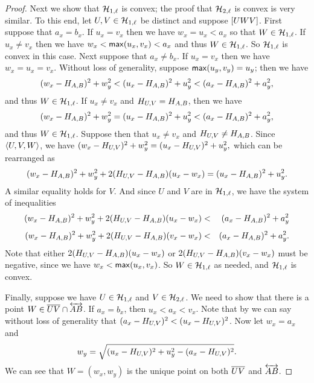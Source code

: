 \begin{proof}
Next we show that \(\mathcal{H}_{1,\ell}\) is convex; the proof that \(\mathcal{H}_{2,\ell}\) is convex is very similar. To this end, let \(U,V \in \mathcal{H}_{1,\ell}\) be distinct and suppose \([ U W V ]\).
First suppose that \(a_x = b_x\).
If \(u_x = v_x\) then we have \(w_x = u_x < a_x\) so that \(W \in \mathcal{H}_{1,\ell}\).
If \(u_x \neq v_x\) then we have \(w_x < \mathsf{max}(u_x,v_x) < a_x\) and thus \(W \in \mathcal{H}_{1,\ell}\).
So \(\mathcal{H}_{1,\ell}\) is convex in this case.
Next suppose that \(a_x \neq b_x\).
If \(u_x = v_x\) then we have \(w_x = u_x = v_x\).
Without loss of generality, suppose \(\mathsf{max}(u_y,v_y) = u_y\); then we have \[ (w_x - H_{A,B})^2 + w_y^2 < (u_x - H_{A,B})^2 + u_y^2 < (a_x - H_{A,B})^2 + a_y^2, \] and thus \(W \in \mathcal{H}_{1,\ell}\).
If \(u_x \neq v_x\) and \(H_{U,V} = H_{A,B}\), then we have \[ (w_x - H_{A,B})^2 + w_y^2 = (u_x - H_{A,B})^2 + u_y^2 < (a_x - H_{A,B})^2 + a_y^2, \] and thus \(W \in \mathcal{H}_{1,\ell}\).
Suppose then that \(u_x \neq v_x\) and \(H_{U,V} \neq H_{A,B}\).
Since \(\langle U, V, W \rangle\), we have \((w_x - H_{U,V})^2 + w_y^2 = (u_x - H_{U,V})^2 + u_y^2,\) which can be rearranged as \[ (w_x - H_{A,B})^2 + w_y^2 + 2(H_{U,V} - H_{A,B})(u_x - w_x) = (u_x - H_{A,B})^2 + u_y^2. \]
A similar equality holds for \(V\).
And since \(U\) and \(V\) are in \(\mathcal{H}_{1,\ell}\), we have the system of inequalities
\begin{eqnarray*}
(w_x - H_{A,B})^2 + w_y^2 + 2(H_{U,V} - H_{A,B})(u_x - w_x) & < & (a_x - H_{A,B})^2 + a_y^2 \\[4pt]
(w_x - H_{A,B})^2 + w_y^2 + 2(H_{U,V} - H_{A,B})(v_x - w_x) & < & (a_x - H_{A,B})^2 + a_y^2.
\end{eqnarray*}
Note that either \(2(H_{U,V} - H_{A,B})(u_x - w_x)\) or \(2(H_{U,V} - H_{A,B})(v_x - w_x)\) must be negative, since we have \(w_x < \mathsf{max}(u_x,v_x)\).
So \(W \in \mathcal{H}_{1,\ell}\) as needed, and \(\mathcal{H}_{1,\ell}\) is convex.

Finally, suppose we have \(U \in \mathcal{H}_{1,\ell}\) and \(V \in \mathcal{H}_{2,\ell}\).
We need to show that there is a point \(W \in \overline{UV} \cap \overleftrightarrow{AB}\).
If \(a_x = b_x\), then \(u_x < a_x < v_x\).
Note that by  we can say without loss of generality that \((a_x - H_{U,V})^2 < (u_x - H_{U,V})^2\).
Now let \(w_x = a_x\) and \[ w_y = \sqrt{(u_x - H_{U,V})^2 + u_y^2 - (a_x - H_{U,V})^2}. \]
We can see that \(W = (w_x,w_y)\) is the unique point on both \(\overline{UV}\) and \(\overleftrightarrow{AB}\).


\end{proof}
